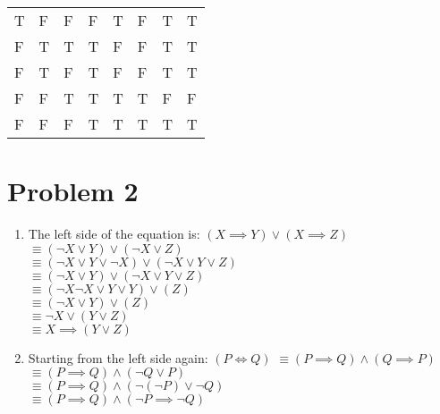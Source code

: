 \documentclass[english]{article}
\begin{document}
\begin{enumerate} [label=\alph*]
\begin{table}[!h]
\begin{tabular}{|l|l|l|l|l|l|l|l|}
        T  & F & F & F           & T           & F                         & T                & T                                                   \\ 
        F  & T & T & T           & F           & F                         & T                & T                                                   \\ 
        F  & T & F & T           & F           & F                         & T                & T                                                   \\ 
        F  & F & T & T           & T           & T                         & F                & F                                                   \\ 
        F  & F & F & T           & T           & T                         & T                & T                                                   \\
        \hline
    \end{tabular}
\end{table}
\end{enumerate}
\section*{Problem 2}
\begin{enumerate} [label=\alph*]
%
\item The left side of the equation is: 
    $ \left(X \implies Y \right) \lor \left( X \implies Z \right)$ \\
    $ \equiv ( \lnot X \lor Y ) \lor (\lnot X \lor Z)$    \\
    $ \equiv ( \lnot X \lor Y \lor \lnot X ) \lor (\lnot X \lor Y \lor Z)$   \\
    $ \equiv ( \lnot X \lor Y) \lor ( \lnot X \lor Y \lor Z)$    \\
    $ \equiv ( \lnot X \lnot X \lor Y \lor Y) \lor (Z)$    \\
    $ \equiv ( \lnot X \lor Y ) \lor ( Z) $   \\
    $ \equiv  \lnot X \lor ( Y \lor Z ) $   \\
    $ \equiv X \implies (Y \lor Z ) $   \\
\item Starting from the left side again:
	$ ( P \iff Q) $
	$ \equiv (P \implies Q ) \land (Q \implies P ) $  \\
	$ \equiv (P \implies Q ) \land (\lnot Q \lor P) $  \\
	$ \equiv (P \implies Q ) \land (\lnot (\lnot P) \lor \lnot Q ) $  \\
	$ \equiv (P \implies Q ) \land (\lnot P \implies \lnot Q) $  \\
\end{enumerate}
\end{document}
